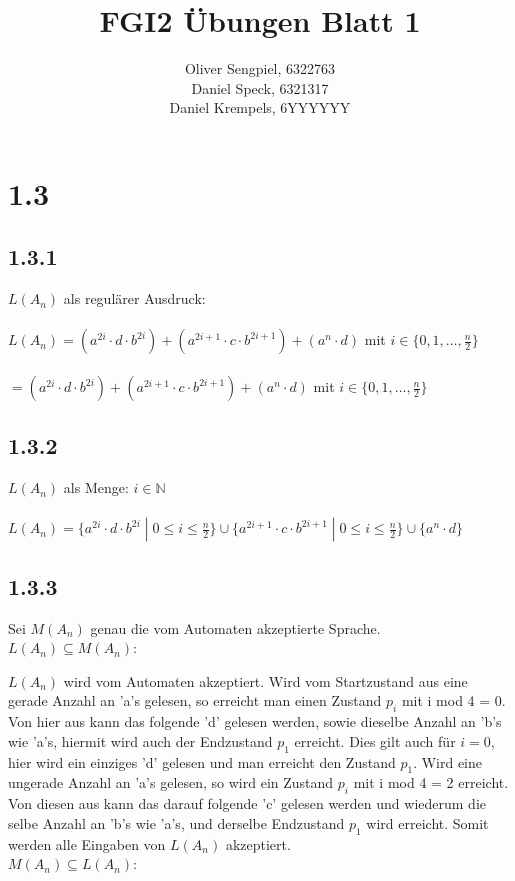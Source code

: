 \documentclass{article}
\title{FGI2 Übungen Blatt 1}
\author{Oliver Sengpiel, 6322763 \\ Daniel Speck, 6321317 \\ Daniel
Krempels, 6YYYYYY}
\begin{document}
\maketitle
\section*{1.3}
\subsection*{1.3.1} 
$L(A_n)$ als regulärer Ausdruck:
\\
\\
$L(A_n) = (a^{2i}\cdot d\cdot b^{2i}) + (a^{2i+1}\cdot c\cdot
b^{2i+1}) + (a^{n}\cdot d) $ mit $i \in \{0, 1, \dots, \frac{n}{2}
\}$
\\
\\
$= (a^{2i}\cdot d\cdot b^{2i}) + (a^{2i+1}\cdot c\cdot
b^{2i+1}) + (a^{n}\cdot d)$ mit $i \in \{0, 1, \dots, \frac{n}{2}
\}$

\subsection*{1.3.2}
$L(A_n)$ als Menge: \hfill $i \in \mathbb{N}$
\\
\\
$L(A_n) = \{ a^{2i} \cdot d \cdot b^{2i} \;|\; 0 \leq i \leq \frac{n}{2} \}
\cup
\{ a^{2i+1} \cdot c \cdot b^{2i+1} \;|\; 0 \leq i \leq \frac{n}{2} \}
\cup
\{ a^n \cdot d \}$

\subsection*{1.3.3}
Sei $M(A_n)$ genau die vom Automaten akzeptierte Sprache. \\ $L(A_n)
\subseteq M(A_n)$: 

$L(A_n)$ wird vom Automaten akzeptiert. Wird vom Startzustand aus eine gerade Anzahl an
'a's gelesen, so erreicht man einen Zustand $p_i$ mit i mod 4 = 0.
Von hier aus kann das folgende 'd' gelesen werden, sowie dieselbe
Anzahl an 'b's wie 'a's, hiermit wird auch der Endzustand $p_1$
erreicht. Dies gilt auch für $i=0$, hier wird ein einziges 'd' gelesen und man erreicht den Zustand $p_1$. Wird eine ungerade Anzahl an 'a's gelesen, so wird ein
Zustand $p_i$ mit i mod 4 = 2 erreicht. Von diesen aus kann das
darauf folgende 'c' gelesen werden und wiederum die selbe Anzahl an
'b's wie 'a's, und derselbe Endzustand $p_1$ wird erreicht. Somit
werden alle Eingaben von $L(A_n)$ akzeptiert. \\ $M(A_n) \subseteq
L(A_n)$: 
\end{document}
